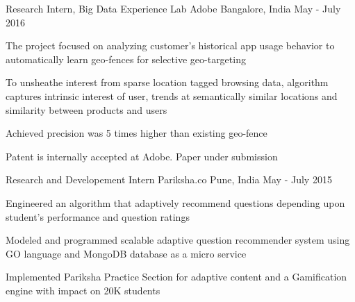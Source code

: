 

\begin{cventries}

  \cventry
    {Research Intern, Big Data Experience Lab} %
    {Adobe} %
    {Bangalore, India} %
    {May - July 2016} %
    {
      \begin{cvitems} %
        \item {The project focused on analyzing customer’s historical app usage behavior to automatically learn geo-fences for selective geo-targeting}
        \item { To unsheathe interest from sparse location tagged browsing data, algorithm captures intrinsic interest of user, trends at semantically similar locations and similarity between products and users}
        \item Achieved precision was 5 times higher than existing geo-fence
        \item Patent is internally accepted at Adobe. Paper under submission
      \end{cvitems}
    }

  \cventry
    {Research and Developement Intern} %
    {Pariksha.co} %
    {Pune, India} %
    {May - July 2015} %
    {
      \begin{cvitems} 
      	\item {Engineered an algorithm that adaptively recommend questions depending upon student’s performance and question ratings}
      	\item {Modeled and programmed scalable adaptive question recommender system using GO language and MongoDB database as a micro service}
      	\item {Implemented Pariksha Practice Section for adaptive content and a Gamification engine with impact on 20K students}
      \end{cvitems}
    }
\end{cventries}
